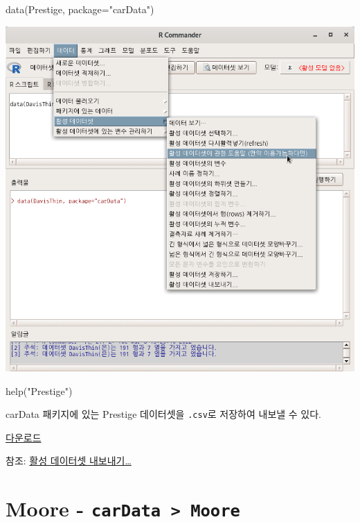 \documentclass[
]{book}
\newenvironment{Shaded}{\begin{snugshade}}{\end{snugshade}}
\newcommand{\AttributeTok}[1]{\textcolor[rgb]{0.77,0.63,0.00}{#1}}
\newcommand{\FunctionTok}[1]{\textcolor[rgb]{0.00,0.00,0.00}{#1}}
\newcommand{\NormalTok}[1]{#1}
\newcommand{\StringTok}[1]{\textcolor[rgb]{0.31,0.60,0.02}{#1}}
\begin{document}
\begin{Shaded}
\begin{Highlighting}[]
\FunctionTok{data}\NormalTok{(Prestige, }\AttributeTok{package=}\StringTok{"carData"}\NormalTok{)}
\end{Highlighting}
\end{Shaded}

\includegraphics{fig/dataset-prestiage-03.png}

\begin{Shaded}
\begin{Highlighting}[]
\FunctionTok{help}\NormalTok{(}\StringTok{"Prestige"}\NormalTok{)}
\end{Highlighting}
\end{Shaded}

carData 패키지에 있는 Prestige 데이터셋을 \texttt{.csv}로 저장하여 내보낼 수 있다.

\href{data/Prestige.csv}{다운로드}

참조: \href{https://rcmdr.tistory.com/52}{활성 데이터셋 내보내기\ldots{}}

\hypertarget{moore---cardata-moore}{%
\section{\texorpdfstring{Moore - \texttt{carData\ \textgreater{}\ Moore}}{Moore - carData \textgreater{} Moore}}\label{moore---cardata-moore}}
\end{document}
